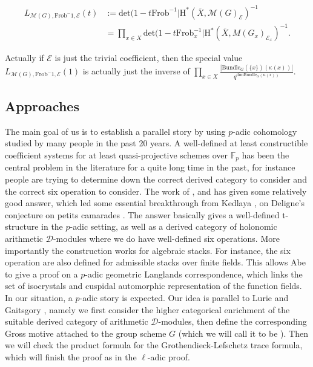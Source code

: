 \documentclass[11pt]{book}
\theoremstyle{definition}
\numberwithin{equation}{section}
\begin{document}
\begin{align}
L_{\mathcal{M}(G),\mathrm{Frob}^-1,\mathcal{E}}(t)&:=\mathrm{det}(1-t\mathrm{Frob}^{-1}|\mathrm{H}^*(\overline{X},\mathcal{M}(G)_\mathcal{E})^{-1}\\
&=\prod_{x\in X}\mathrm{det}(1-t\mathrm{Frob}_x^{-1}|\mathrm{H}^*(\overline{X},M(G_x)_{\mathcal{E}_x})^{-1}.
\end{align}

\indent Actually if $\mathcal{E}$ is just the trivial coefficient, then the special value $L_{\mathcal{M}(G),\mathrm{Frob}^-1,\mathcal{E}}(1)$ is actually just the inverse of $\prod_{x\in X}\frac{|\mathrm{Bundle}_G(\{x\})(\kappa(x))|}{q^{\mathrm{dim}\mathrm{Bundle}_G(\kappa(x))}}$.








\newpage
\subsection{Approaches}
The main goal of us is to establish a parallel story by using $p$-adic cohomology studied by many people in the past 20 years. A well-defined at least constructible coefficient systems for at least quasi-projective schemes over $\mathbb{F}_p$ has been the central problem in the literature for a quite long time in the past, for instance people are trying to determine down the correct derived category to consider and the correct six operation to consider. The work of \cite{Ca}, \cite{Abe1} and \cite{AC1} has given some relatively good answer, which led some essential breakthrough from Kedlaya \cite{Ked11}, \cite{Ked12} on Deligne's conjecture on petits camarades \cite{De1}. The answer basically gives a well-defined t-structure in the $p$-adic setting, as well as a derived category of holonomic arithmetic $\mathcal{D}$-modules where we do have well-defined six operations. More importantly the construction works for algebraic stacks. For instance, the six operation are also defined for admissible stacks over finite fields. This allows Abe to give a proof on a $p$-adic geometric Langlands correspondence, which links the set of isocrystals and cuspidal automorphic representation of the function fields.\\

\indent In our situation, a $p$-adic story is expected. Our idea is parallel to Lurie and Gaitsgory \cite{GL1}, namely we first consider the higher categorical enrichment of the suitable derived category of arithmetic $\mathcal{D}$-modules, then define the corresponding Gross motive \cite{Gro1} attached to the group scheme $G$ (which we will call it to be ). Then we will check the product formula for the Grothendieck-Lefschetz trace formula, which will finish the proof as in the $\ell$-adic proof. 
\end{document}
